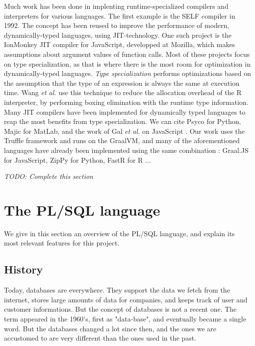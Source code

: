 \documentclass[twoside,11pt,a4paper]{article}
\newcommand{\todo}[1]{\textit{TODO: #1}}
\newcommand{\etal}{\textit{et al.}}
\newcommand{\startsection}[1]{
	\cleardoublepage
	\section{#1}
	\thispagestyle{basic}
}
\begin{document}

Much work has been done in implenting runtime-specialized compilers and interpreters for various languages. The first example is the SELF \cite{self} compiler in 1992. The concept has been reused to improve the performance of modern, dynamically-typed languages, using JIT-technology. One such project is the IonMonkey \cite{jsvalue} JIT compiler for JavaScript, developped at Mozilla, which makes assumptions about argument values of function calls. Most of these projects focus on type specialization, as that is where there is the most room for optimization in dynamically-typed languages. \textit{Type specialization} performs optimizations based on the assumption that the type of an expression is always the same at execution time. Wang \etal{} \cite{rspec} use this technique to reduce the allocation overhead of the R interpreter, by performing boxing elimination with the runtime type information. Many JIT compilers have been implemented for dynamically typed languages to reap the most benefits from type specialization. We can cite Psyco \cite{psyco} for Python, Majic \cite{majic} for MatLab, and the work of Gal \etal{} on JavaScript \cite{gal, gal2}. Our work uses the Truffle framework and runs on the GraalVM, and many of the aforementioned languages have already been implemented using the same combination : Graal.JS \cite{trufflespec} for JavaScript, ZipPy \cite{zippy} for Python, FastR \cite{fastr} for R ...

\todo{Complete this section}


\startsection{The PL/SQL language}

We give in this section an overview of the PL/SQL language, and explain its most relevant features for this project.

\subsection{History}

Today, databases are everywhere. They support the data we fetch from the internet, stores large amounts of data for companies, and keeps track of user and customer informations. But the concept of databases is not a recent one. The term appeared in the 1960's, first as "data-base", and eventually became a single word. But the databases changed a lot since then, and the ones we are accustomed to are very different than the ones used in the past.
\end{document}
